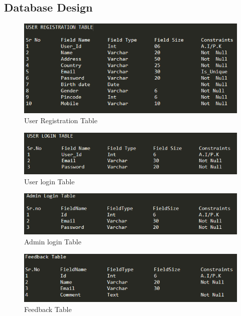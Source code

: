 \subsection{Database Design}
\begin{figure}[h]
	\label{ss}    %
	\centering
	\includegraphics[width= 11 cm]{regtable.png}
	\caption{User Registration Table}
\end{figure}

\newpage

\begin{figure}[h]
	\label{ss}    %
	\centering
	\includegraphics[width= 13 cm]{ulogin.png}
	\caption{User login Table}
\end{figure}

\begin{figure}[h]
	\label{ss}    %
	\centering
	\includegraphics[width= 13 cm]{alogin.png}
	\caption{Admin login Table}
\end{figure}
\begin{figure}[h]
	\label{ss}    %
	\centering
	\includegraphics[width= 13 cm]{feedback.png}
	\caption{Feedback Table}
\end{figure}


